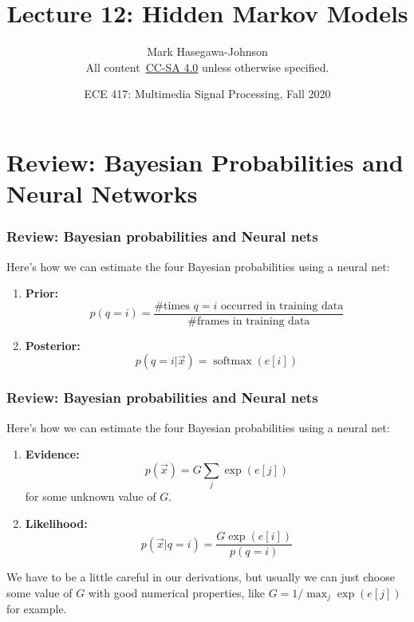 \documentclass{beamer}
\title{Lecture 12: Hidden Markov Models}
\author{Mark Hasegawa-Johnson\\All content~\href{https://creativecommons.org/licenses/by-sa/4.0/}{CC-SA 4.0} unless otherwise specified.}
\date{ECE 417: Multimedia Signal Processing, Fall 2020}
\DeclareMathOperator*{\softmax}{softmax}
\begin{document}
\begin{frame}
  \maketitle
\end{frame}

\begin{frame}
  \tableofcontents
\end{frame}

\section[Review]{Review: Bayesian Probabilities and Neural Networks}
\setcounter{subsection}{1}

\begin{frame}
  \frametitle{Review: Bayesian probabilities and Neural nets}
  Here's how we can estimate the four Bayesian probabilities using a neural net:
  \begin{enumerate}
  \item {\bf Prior:}
    \begin{displaymath}
      p(q=i) = \frac{\mbox{\# times $q=i$ occurred in training data}}{\mbox{\# frames in training data}}
    \end{displaymath}
  \item {\bf Posterior:}
    \begin{displaymath}
      p(q=i|\vec{x}) = \softmax\left(e[i]\right)
    \end{displaymath}
  \end{enumerate}
\end{frame}

    
\begin{frame}
  \frametitle{Review: Bayesian probabilities and Neural nets}
  Here's how we can estimate the four Bayesian probabilities using a neural net:
  \begin{enumerate}
  \item {\bf Evidence:}
    \begin{displaymath}
      p(\vec{x}) = G\sum_j\exp(e[j])
    \end{displaymath}
    for some unknown value of $G$.
  \item {\bf Likelihood:}
    \begin{displaymath}
      p(\vec{x}|q=i) = \frac{G\exp(e[i])}{p(q=i)}
    \end{displaymath}
  \end{enumerate}
  We have to be a little careful in our derivations, but usually we
  can just choose some value of $G$ with good numerical properties,
  like $G=1/\max_j \exp(e[j])$ for example.
\end{frame}
\end{document}
